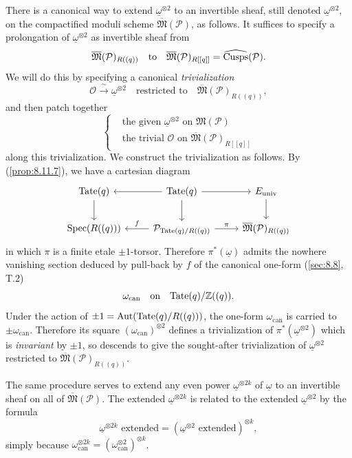 \kmitem\label{item:10.13.2}
There is a canonical way to extend $\underline{\omega}^{\otimes 2}$ to an invertible sheaf, still denoted $\underline{\omega}^{\otimes 2}$, on the compactified moduli scheme $\overline{\mathfrak{M}}(\mathcal{P})$, as follows. It suffices to specify a prolongation of $\underline{\omega}^{\otimes 2}$ as invertible sheaf from
\[
\overline{\mathfrak{M}}(\mathcal{P})_{R((q))} \quad\text{to}\quad \overline{\mathfrak{M}}(\mathcal{P})_{R[[q]]} = \widehat{\operatorname{Cusps}}(\mathcal{P}) .
\]
We will do this by specifying a canonical \emph{trivialization}
\[
\mathcal{O} \xrightarrow{\ \sim\ } \underline{\omega}^{\otimes 2} \quad\text{restricted to}\quad \overline{\mathfrak{M}}(\mathcal{P})_{R((q))} ,
\]
and then patch together
\[
\left\{
\begin{aligned}
&\text{the given } \underline{\omega}^{\otimes 2} \text{ on } \mathfrak{M}(\mathcal{P}) \\
&\text{the trivial } \mathcal{O} \text{ on } \overline{\mathfrak{M}}(\mathcal{P})_{R[[q]]}
\end{aligned}
\right.
\]
along this trivialization. We construct the trivialization as follows. By (\ref{prop:8.11.7}), we have a cartesian diagram
\[
\begin{tikzcd}[row sep=2.0em, column sep=2.5em]
\Tate(q) \arrow[d] & \Tate(q) \arrow[l] \arrow[d] \arrow[r] & E_{\mathrm{univ}} \arrow[d] \\
\Spec(R((q))) & \mathcal{P}_{\Tate(q)/R((q))} \arrow[l, "f"'] \arrow[r, "\pi"] & \overline{\mathfrak{M}}(\mathcal{P})_{R((q))}
\end{tikzcd}
\]
in which $\pi$ is a finite etale $\pm 1$-torsor. Therefore $\pi^*(\underline{\omega})$ admits the nowhere vanishing section deduced by pull-back by $f$ of the canonical one-form (\ref{sec:8.8}, T.2)
\[
\omega_{\mathrm{can}} \quad\text{on}\quad \mathrm{Tate}(q)/\mathbb{Z}((q)) .
\]
Under the action of $\pm 1 = \operatorname{Aut}(\mathrm{Tate}(q)/R((q)))$, the one-form $\omega_{\mathrm{can}}$ is carried to $\pm \omega_{\mathrm{can}}$. Therefore its square $(\omega_{\mathrm{can}})^{\otimes 2}$ defines a trivialization of $\pi^*(\underline{\omega}^{\otimes 2})$ which is \emph{invariant} by $\pm 1$, so descends to give the sought-after trivialization of $\underline{\omega}^{\otimes 2}$ restricted to $\overline{\mathfrak{M}}(\mathcal{P})_{R((q))}$.

The same procedure serves to extend any even power $\underline{\omega}^{\otimes 2k}$ of $\underline{\omega}$ to an invertible sheaf on all of $\overline{\mathfrak{M}}(\mathcal{P})$. The extended $\underline{\omega}^{\otimes 2k}$ is related to the extended $\underline{\omega}^{\otimes 2}$ by the formula
\[
\underline{\omega}^{\otimes 2k}\text{ extended} = (\underline{\omega}^{\otimes 2}\text{ extended})^{\otimes k} ,
\]
simply because $\omega_{\mathrm{can}}^{\otimes 2k} = (\omega_{\mathrm{can}}^{\otimes 2})^{\otimes k}$.

